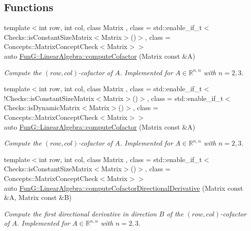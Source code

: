 \subsection*{Functions}
\begin{DoxyCompactItemize}
\item 
{\footnotesize template$<$int row, int col, class Matrix , class  = std\-::enable\-\_\-if\-\_\-t$<$\-Checks\-::is\-Constant\-Size\-Matrix$<$\-Matrix$>$()$>$, class  = Concepts\-::\-Matrix\-Concept\-Check$<$\-Matrix$>$$>$ }\\auto \hyperlink{group__LinearAlgebraGroup_gace32a0876d4a8333f3bfc564316085ed}{Fun\-G\-::\-Linear\-Algebra\-::compute\-Cofactor} (Matrix const \&A)
\begin{DoxyCompactList}\small\item\em Compute the $(row,col)$-\/cofactor of $ A $. Implemented for $ A\in \mathbb{R}^{n,n} $ with $ n=2,3 $. \end{DoxyCompactList}\item 
{\footnotesize template$<$int row, int col, class Matrix , class  = std\-::enable\-\_\-if\-\_\-t$<$!\-Checks\-::is\-Constant\-Size\-Matrix$<$\-Matrix$>$()$>$, class  = std\-::enable\-\_\-if\-\_\-t$<$\-Checks\-::is\-Dynamic\-Matrix$<$\-Matrix$>$()$>$, class  = Concepts\-::\-Matrix\-Concept\-Check$<$\-Matrix$>$$>$ }\\auto \hyperlink{group__LinearAlgebraGroup_ga136d54e30266690f0d07039fc70a1cb9}{Fun\-G\-::\-Linear\-Algebra\-::compute\-Cofactor} (Matrix const \&A)
\begin{DoxyCompactList}\small\item\em Compute the $(row,col)$-\/cofactor of $ A $. Implemented for $ A\in \mathbb{R}^{n,n} $ with $ n=2,3 $. \end{DoxyCompactList}\item 
{\footnotesize template$<$int row, int col, class Matrix , class  = std\-::enable\-\_\-if\-\_\-t$<$\-Checks\-::is\-Constant\-Size\-Matrix$<$\-Matrix$>$()$>$, class  = Concepts\-::\-Matrix\-Concept\-Check$<$\-Matrix$>$$>$ }\\auto \hyperlink{group__LinearAlgebraGroup_ga3970ee7fa4d47612427a59cecf56746c}{Fun\-G\-::\-Linear\-Algebra\-::compute\-Cofactor\-Directional\-Derivative} (Matrix const \&A, Matrix const \&B)
\begin{DoxyCompactList}\small\item\em Compute the first directional derivative in direction $ B $ of the $(row,col)$-\/cofactor of $ A $. Implemented for $ A\in \mathbb{R}^{n,n} $ with $ n=2,3 $. \end{DoxyCompactList}\item 

\end{DoxyCompactItemize}
